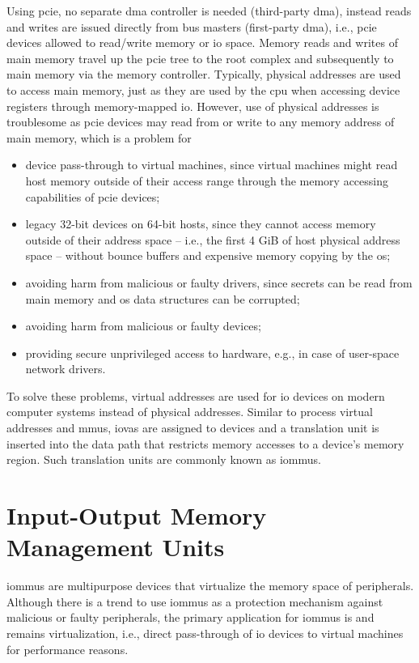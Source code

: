 Using \ac{pcie}, no separate \ac{dma} controller is needed (third-party
\ac{dma}), instead reads and writes are issued directly from bus masters
(first-party \ac{dma}), i.e., \ac{pcie} devices allowed to read/write memory or
\ac{io} space. Memory reads and writes of main memory travel up the \ac{pcie}
tree to the root complex and subsequently to main memory via the memory
controller. Typically, physical addresses are used to access main memory, just
as they are used by the \ac{cpu} when accessing device registers through
memory-mapped \ac{io}. However, use of physical addresses is troublesome as
\ac{pcie} devices may read from or write to any memory address of main memory,
which is a problem for

\begin{itemize}
    \item device pass-through to virtual machines, since virtual machines might
        read host memory outside of their access range through the memory
        accessing capabilities of \ac{pcie} devices;
    \item legacy 32-bit devices on 64-bit hosts, since they cannot access memory
        outside of their address space -- i.e., the first 4 GiB of host physical
        address space -- without bounce buffers and expensive memory copying by
        the \ac{os};
    \item avoiding harm from malicious or faulty drivers, since secrets can be
        read from main memory and \ac{os} data structures can be corrupted;
    \item avoiding harm from malicious or faulty devices;
    \item providing secure unprivileged access to hardware, e.g., in case of
        user-space network drivers.
\end{itemize}

To solve these problems, virtual addresses are used for \ac{io} devices on
modern computer systems instead of physical addresses. Similar to process
virtual addresses and \acp{mmu}, \acp{iova} are assigned to devices and a
translation unit is inserted into the data path that restricts memory accesses
to a device's memory region. Such translation units are commonly known as
\acfp{iommu}.


\section{Input-Output Memory Management Units}
\label{sec:iommus}

\acp{iommu} are multipurpose devices that virtualize the memory space of
peripherals. Although there is a trend to use \acp{iommu} as a protection
mechanism against malicious or faulty peripherals, the primary application for
\acp{iommu} is and remains virtualization, i.e., direct pass-through of \ac{io}
devices to virtual machines for performance reasons.

